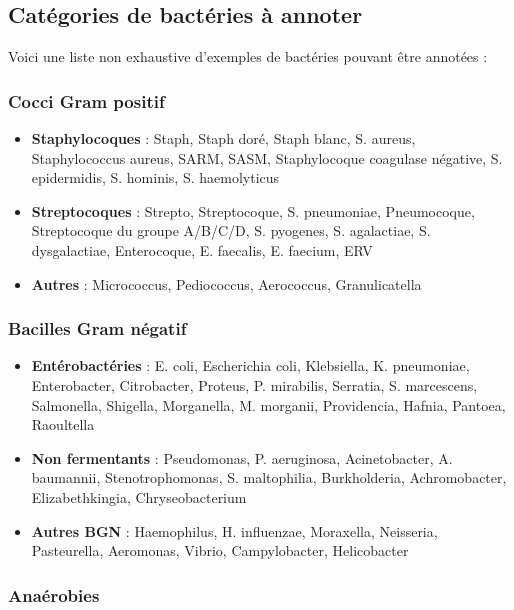 \subsection{Catégories de bactéries à annoter}
\label{sec:exemples_bacteries}

Voici une liste non exhaustive d'exemples de bactéries pouvant être annotées :

\subsubsection{Cocci Gram positif}

\begin{itemize}
    \item \textbf{Staphylocoques} : Staph, Staph doré, Staph blanc, S. aureus, Staphylococcus aureus, SARM, SASM, Staphylocoque coagulase négative, S. epidermidis, S. hominis, S. haemolyticus
    \item \textbf{Streptocoques} : Strepto, Streptocoque, S. pneumoniae, Pneumocoque, Streptocoque du groupe A/B/C/D, S. pyogenes, S. agalactiae, S. dysgalactiae, Enterocoque, E. faecalis, E. faecium, ERV
    \item \textbf{Autres} : Micrococcus, Pediococcus, Aerococcus, Granulicatella
\end{itemize}

\subsubsection{Bacilles Gram négatif}

\begin{itemize}
    \item \textbf{Entérobactéries} : E. coli, Escherichia coli, Klebsiella, K. pneumoniae, Enterobacter, Citrobacter, Proteus, P. mirabilis, Serratia, S. marcescens, Salmonella, Shigella, Morganella, M. morganii, Providencia, Hafnia, Pantoea, Raoultella
    \item \textbf{Non fermentants} : Pseudomonas, P. aeruginosa, Acinetobacter, A. baumannii, Stenotrophomonas, S. maltophilia, Burkholderia, Achromobacter, Elizabethkingia, Chryseobacterium
    \item \textbf{Autres BGN} : Haemophilus, H. influenzae, Moraxella, Neisseria, Pasteurella, Aeromonas, Vibrio, Campylobacter, Helicobacter
\end{itemize}

\subsubsection{Anaérobies}

